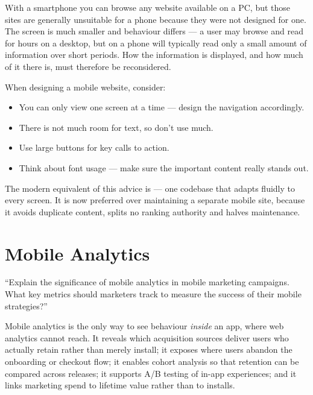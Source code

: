 With a smartphone you can browse any website available on a PC, but those sites
are generally unsuitable for a phone because they were not designed for one. The
screen is much smaller and behaviour differs --- a user may browse and read for
hours on a desktop, but on a phone will typically read only a small amount of
information over short periods. How the information is displayed, and how much of
it there is, must therefore be reconsidered.

\noindent When designing a mobile website, consider:

\begin{itemize}
\item You can only view one screen at a time --- design the navigation
      accordingly.
\item There is not much room for text, so don't use much.
\item Use large buttons for key calls to action.
\item Think about font usage --- make sure the important content really stands
      out.
\end{itemize}

\begin{keybox}
The modern equivalent of this advice is  --- one codebase that adapts fluidly to every screen.
It is now preferred over maintaining a separate mobile site, because it avoids
duplicate content, splits no ranking authority and halves maintenance.
\end{keybox}

\section{Mobile Analytics}

\begin{keybox}
``Explain the significance of mobile analytics in mobile marketing campaigns. What
key metrics should marketers track to measure the success of their mobile
strategies?''
\end{keybox}

\begin{exambox}[Significance]
Mobile analytics is the only way to see behaviour \emph{inside} an app, where web
analytics cannot reach. It reveals which acquisition sources deliver users who
actually retain rather than merely install; it exposes where users abandon the
onboarding or checkout flow; it enables cohort analysis so that retention can be
compared across releases; it supports A/B testing of in-app experiences; and it
links marketing spend to lifetime value rather than to installs.
\end{exambox}

